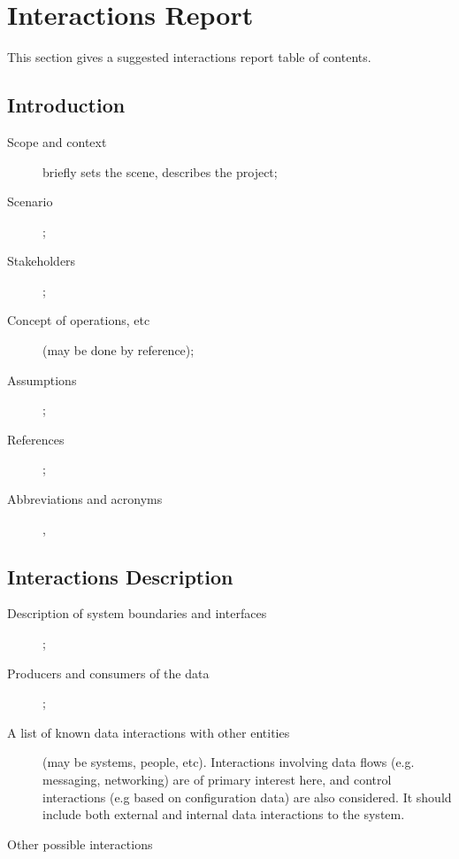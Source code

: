 %
%
\chapter{Interactions Report} \label{bkm:interactions}

This section gives a suggested interactions report table of contents.
\section{Introduction}
\begin{description}
	\item[Scope and context] briefly sets the scene, describes the project;
	\item[Scenario];
	\item[Stakeholders];
	\item[Concept of operations, etc] (may be done by reference); \item[Assumptions];
	\item[References];
	\item[Abbreviations and acronyms],
\end{description}
\section{Interactions Description}
\begin{description}
\item[Description of system boundaries and interfaces]; 
\item[Producers and consumers of the data];
\item[A list of known data interactions with other entities] (may be systems, people, etc). Interactions involving data flows (e.g. messaging, networking) are of primary interest here, and control interactions (e.g based on configuration data) are also considered. It should include both external and internal data interactions to the system.
\item[Other possible interactions]
\end{description}
